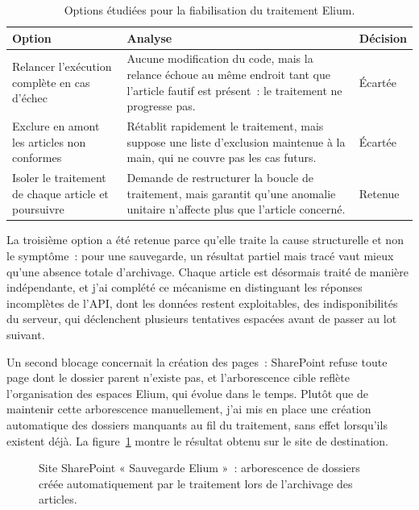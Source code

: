 \begin{table}[H]
  \centering
  \caption{Options étudiées pour la fiabilisation du traitement Elium.}
  \label{tab:elium-options}
  \begin{tabularx}{\textwidth}{p{3.4cm} X p{1.9cm}}
    \toprule
    \bfseries Option & \bfseries Analyse & \bfseries Décision \\
    \midrule
    Relancer l'exécution complète en cas d'échec
      & Aucune modification du code, mais la relance échoue au même endroit tant
        que l'article fautif est présent~: le traitement ne progresse pas.
      & Écartée \\
    Exclure en amont les articles non conformes
      & Rétablit rapidement le traitement, mais suppose une liste d'exclusion
        maintenue à la main, qui ne couvre pas les cas futurs.
      & Écartée \\
    Isoler le traitement de chaque article et poursuivre
      & Demande de restructurer la boucle de traitement, mais garantit qu'une
        anomalie unitaire n'affecte plus que l'article concerné.
      & Retenue \\
    \bottomrule
  \end{tabularx}
\end{table}

La troisième option a été retenue parce qu'elle traite la cause structurelle et
non le symptôme~: pour une sauvegarde, un résultat partiel mais tracé vaut mieux
qu'une absence totale d'archivage. Chaque article est désormais traité de
manière indépendante, et j'ai complété ce mécanisme en distinguant les réponses
incomplètes de l'API, dont les données restent exploitables, des
indisponibilités du serveur, qui déclenchent plusieurs tentatives espacées avant
de passer au lot suivant.

Un second blocage concernait la création des pages~: SharePoint refuse toute
page dont le dossier parent n'existe pas, et l'arborescence cible reflète
l'organisation des espaces Elium, qui évolue dans le temps. Plutôt que de
maintenir cette arborescence manuellement, j'ai mis en place une création
automatique des dossiers manquants au fil du traitement, sans effet lorsqu'ils
existent déjà. La figure~\ref{fig:elium-pages} montre le résultat obtenu sur le
site de destination.

\begin{figure}[H]
  \centering
  \caption{Site SharePoint « Sauvegarde Elium »~: arborescence de dossiers créée
    automatiquement par le traitement lors de l'archivage des articles.}
  \label{fig:elium-pages}
\end{figure}

